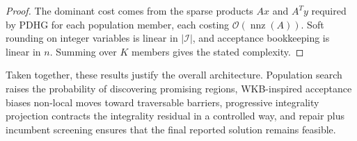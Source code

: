 \begin{proof}
The dominant cost comes from the sparse products $Ax$ and $A^T y$ required by PDHG for each population member, each costing $\mathcal{O}(\operatorname{nnz}(A))$. Soft rounding on integer variables is linear in $|\mathcal{I}|$, and acceptance bookkeeping is linear in $n$. Summing over $K$ members gives the stated complexity.
\end{proof}

Taken together, these results justify the overall architecture. Population search raises the probability of discovering promising regions, WKB-inspired acceptance biases non-local moves toward traversable barriers, progressive integrality projection contracts the integrality residual in a controlled way, and repair plus incumbent screening ensures that the final reported solution remains feasible.
